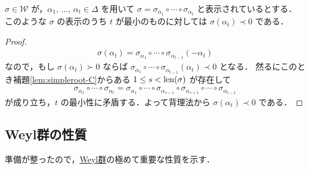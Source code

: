 \documentclass[rep_main]{subfiles}
\begin{document}
\begin{mycol}[label=col:simpleroot-C]{}
	$\sigma \in \mathscr{W}$ が，$\alpha_1,\, \dots,\, \alpha_{t} \in \Delta$ を用いて $\sigma = \sigma_{\alpha_1} \circ \cdots \circ \sigma_{\alpha_t}$ と表示されているとする．
	このような $\sigma$ の表示のうち $t$ が最小のものに対しては $\sigma(\alpha_{t}) \prec 0$ である．
\end{mycol}

\begin{proof}
	\begin{align}
		\sigma(\alpha_{t}) = \sigma_{\alpha_1} \circ \cdots \circ \sigma_{\alpha_{t - 1}} (-\alpha_{t})
	\end{align}
	なので，もし $\sigma(\alpha_{t}) \succ 0$ ならば $\sigma_{\alpha_1} \circ \cdots \circ \sigma_{\alpha_{t - 1}}(\alpha_{t}) \prec 0$ となる．
	然るにこのとき補題\ref{lem:simpleroot-C}からある $1 \le s < \operatorname{len} (\sigma)$ が存在して
	\begin{align}
		\sigma_{\alpha_1} \circ \cdots \circ \sigma_{\alpha_{t}} = \sigma_{\alpha_1} \circ \cdots \circ \sigma_{\alpha_{s-1}} \circ \sigma_{\alpha_{s+1}} \circ \cdots \circ \sigma_{\alpha_{t -1}}
	\end{align}
	が成り立ち，$t$ の最小性に矛盾する．よって背理法から $\sigma(\alpha_{t}) \prec 0$ である．
\end{proof}

\subsection{Weyl群の性質}

準備が整ったので，\hyperref[def:Weylgroup]{Weyl群}の極めて重要な性質を示す．
\end{document}
